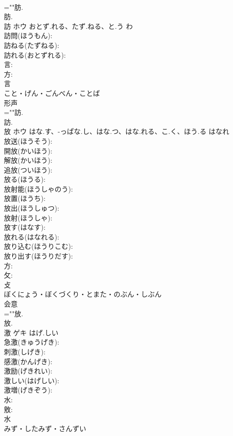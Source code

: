 \documentclass[8pt]{extreport}
\begin{document}
\begin{CJK}{UTF8}{min}
\\	=""肪.
\\	肪.
\\	訪	ホウ	おとず.れる、たず.ねる、と.う	わ	
\\	訪問(ほうもん): 
\\	訪ねる(たずねる): 
\\	訪れる(おとずれる): 
\\	言: 
\\	方: 
\\	言	
\\	こと・げん・ごんべん・ことば	
\\	形声 
\\	=""訪.
\\	訪.
\\	放	ホウ	はな.す、-っぱな.し、はな.つ、はな.れる、こ.く、ほう.る	はなれ	
\\	放送(ほうそう): 
\\	開放(かいほう): 
\\	解放(かいほう): 
\\	追放(ついほう): 
\\	放る(ほうる): 
\\	放射能(ほうしゃのう): 
\\	放置(ほうち): 
\\	放出(ほうしゅつ): 
\\	放射(ほうしゃ): 
\\	放す(はなす): 
\\	放れる(はなれる): 
\\	放り込む(ほうりこむ): 
\\	放り出す(ほうりだす): 
\\	方: 
\\	攵: 
\\	攴	
\\	ぼくにょう・ぼくづくり・とまた・のぶん・しぶん	
\\	会意 
\\	=""放.
\\	放.
\\	激	ゲキ	はげ.しい		
\\	急激(きゅうげき): 
\\	刺激(しげき): 
\\	感激(かんげき): 
\\	激励(げきれい): 
\\	激しい(はげしい): 
\\	激増(げきぞう): 
\\	水: 
\\	敫: 
\\	水	
\\	みず・したみず・さんずい	

\end{CJK}
\end{document}
